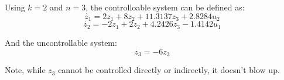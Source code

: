 \documentclass[10pt]{article}
\begin{document}
Using $k = 2$ and $n = 3$, the controlloable system can be defined as:
\begin{equation*}
    \dot{z_1} = 2z_1 + 8z_2 + 11.3137z_3 + 2.8284u_2
\end{equation*}
\begin{equation*}
    \dot{z_2} = - 2z_1 + 2z_2 + 4.2426z_3 - 1.4142u_1
\end{equation*}

And the uncontrollable system:
\begin{equation*}
    \dot{z_3} = -6z_3
\end{equation*}

Note, while $z_3$ cannot be controlled directly or indirectly, it doesn't blow up. 
\end{document}
